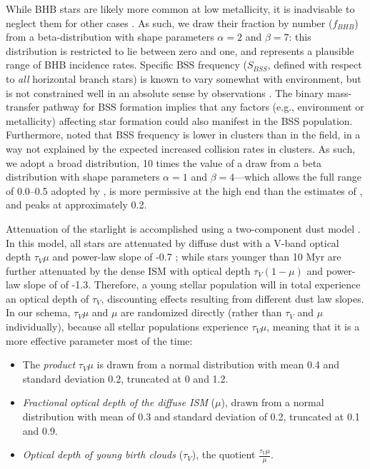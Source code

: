 While BHB stars are likely more common at low metallicity, it is inadvisable to neglect them for other cases \citet{fsps_1}. As such, we draw their fraction by number ($f_{BHB}$) from a beta-distribution with shape parameters $\alpha=2$ and $\beta=7$: this distribution is restricted to lie between zero and one, and represents a plausible range of BHB incidence rates. Specific BSS frequency ($S_{BSS}$, defined with respect to \emph{all} horizontal branch stars) is known to vary somewhat with environment, but is not constrained well in an absolute sense by observations \citep{santucci_2015_BSS}. The binary mass-transfer pathway for BSS formation \citep{gosnell_14_bluestraggler} implies that any factors (e.g., environment or metallicity) affecting star formation could also manifest in the BSS population. Furthermore, \citet{piotto_04_bluestraggler} noted that BSS frequency is lower in clusters than in the field, in a way not explained by the expected increased collision rates in clusters. As such, we adopt a broad distribution, 10 times the value of a draw from a beta distribution with shape parameters $\alpha=1$ and $\beta=4$---which allows the full range of 0.0--0.5 adopted by \citet{fsps_1}, is more permissive at the high end than the estimates of \citet{dorman_95}, and peaks at approximately 0.2.

Attenuation of the starlight is accomplished using a two-component dust model \citep{charlot_fall_00}. In this model, all stars are attenuated by diffuse dust with a V-band optical depth $\tau_V \mu$ and power-law slope of -0.7 \citep[as in][]{chevallard_charlot_16_beagle, da-cunha_charlot_elbaz_08}; while stars younger than 10 Myr are further attenuated by the dense ISM with optical depth $\tau_V (1 - \mu)$ and power-law slope of of -1.3. Therefore, a young stellar population will in total experience an optical depth of $\tau_V$, discounting effects resulting from different dust law slopes. In our schema, $\tau_V \mu$ and $\mu$ are randomized directly (rather than $\tau_V$ and $\mu$ individually), because all stellar populations experience $\tau_V \mu$, meaning that it is a more effective parameter most of the time:

\begin{itemize}
    \itemsep0em
    \item The \emph{product} $\tau_V \mu$ is drawn from a normal distribution with mean 0.4 and standard deviation 0.2, truncated at 0 and 1.2.
    \item \emph{Fractional optical depth of the diffuse ISM} ($\mu$), drawn from a normal distribution with mean of 0.3 and standard deviation of 0.2, truncated at 0.1 and 0.9.
    \item \emph{Optical depth of young birth clouds} ($\tau_V$), the quotient $\frac{\tau_V \mu}{\mu}$.
\end{itemize}

